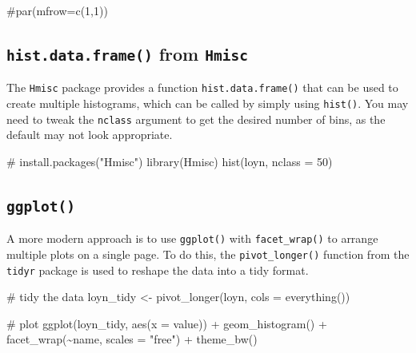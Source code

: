 \documentclass[
  10pt,
  letterpaper,
  DIV=11,
  numbers=noendperiod]{scrartcl}
\newenvironment{Shaded}{\begin{snugshade}}{\end{snugshade}}
\newcommand{\AttributeTok}[1]{\textcolor[rgb]{0.40,0.45,0.13}{#1}}
\newcommand{\CommentTok}[1]{\textcolor[rgb]{0.37,0.37,0.37}{#1}}
\newcommand{\DecValTok}[1]{\textcolor[rgb]{0.68,0.00,0.00}{#1}}
\newcommand{\FunctionTok}[1]{\textcolor[rgb]{0.28,0.35,0.67}{#1}}
\newcommand{\NormalTok}[1]{\textcolor[rgb]{0.00,0.23,0.31}{#1}}
\newcommand{\OtherTok}[1]{\textcolor[rgb]{0.00,0.23,0.31}{#1}}
\newcommand{\SpecialCharTok}[1]{\textcolor[rgb]{0.37,0.37,0.37}{#1}}
\newcommand{\StringTok}[1]{\textcolor[rgb]{0.13,0.47,0.30}{#1}}
\begin{document}
\begin{Shaded}
\begin{Highlighting}[]
\CommentTok{\#par(mfrow=c(1,1))}
\end{Highlighting}
\end{Shaded}

\subsection{\texorpdfstring{\texttt{hist.data.frame()} from
\texttt{Hmisc}}{hist.data.frame() from Hmisc}}

The \texttt{Hmisc} package provides a function
\texttt{hist.data.frame()} that can be used to create multiple
histograms, which can be called by simply using \texttt{hist()}. You may
need to tweak the \texttt{nclass} argument to get the desired number of
bins, as the default may not look appropriate.

\begin{Shaded}
\begin{Highlighting}[]
\CommentTok{\# install.packages("Hmisc")}
\FunctionTok{library}\NormalTok{(Hmisc)}
\FunctionTok{hist}\NormalTok{(loyn, }\AttributeTok{nclass =} \DecValTok{50}\NormalTok{)}
\end{Highlighting}
\end{Shaded}

\subsection{\texorpdfstring{\texttt{ggplot()}}{ggplot()}}

A more modern approach is to use \texttt{ggplot()} with
\texttt{facet\_wrap()} to arrange multiple plots on a single page. To do
this, the \texttt{pivot\_longer()} function from the \texttt{tidyr}
package is used to reshape the data into a tidy format.

\begin{Shaded}
\begin{Highlighting}[]
\CommentTok{\# tidy the data}
\NormalTok{loyn\_tidy }\OtherTok{\textless{}{-}} \FunctionTok{pivot\_longer}\NormalTok{(loyn, }\AttributeTok{cols =} \FunctionTok{everything}\NormalTok{())}

\CommentTok{\# plot}
\FunctionTok{ggplot}\NormalTok{(loyn\_tidy, }\FunctionTok{aes}\NormalTok{(}\AttributeTok{x =}\NormalTok{ value)) }\SpecialCharTok{+} 
  \FunctionTok{geom\_histogram}\NormalTok{() }\SpecialCharTok{+} 
  \FunctionTok{facet\_wrap}\NormalTok{(}\SpecialCharTok{\textasciitilde{}}\NormalTok{name, }\AttributeTok{scales =} \StringTok{"free"}\NormalTok{) }\SpecialCharTok{+}
  \FunctionTok{theme\_bw}\NormalTok{()}
\end{Highlighting}
\end{Shaded}
\end{document}
